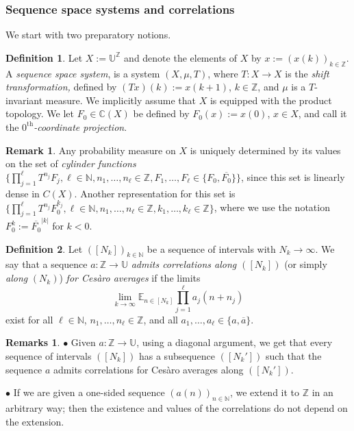 \documentclass[11pt]{amsart}
\theoremstyle{definition}
\newtheorem{definition}{Definition}[section]
\newtheorem*{remark}{Remark}
\newtheorem*{remarks}{Remarks}
\newcommand{\C}{{\mathbb C}}
\newcommand{\E}{{\mathbb E}}
\newcommand{\N}{{\mathbb N}}
\newcommand{\Z}{{\mathbb Z}}
\newcommand{\U}{{\mathbb U}}
\begin{document}
\subsubsection{Sequence space systems and correlations}
We start with two preparatory notions.
\begin{definition}\label{D:sequencespace}
Let  $X:=\U^\Z$ and denote  the elements of $X$ by $x:=(x(k))_{k\in\Z}$.
	A {\em sequence space system}, is a system $(X,\mu,T)$, where  $T\colon X\to X$  is the {\em shift transformation,}    defined by $(Tx)(k):=x(k+1)$, $k\in \Z$, and $\mu$ is a $T$-invariant measure. We implicitly assume that $X$ is equipped with the product topology.
	We let $F_0\in \C(X)$  be defined by $F_0(x):=x(0)$, $x \in X$, and call it the {\em $0^{\text{th}}$-coordinate projection}.
\end{definition}
\begin{remark} Any probability measure on $X$ is uniquely determined by its values on the set of {\em cylinder functions}
	$\{\prod_{j=1}^\ell T^{n_j} F_{j}, \ell\in\N, n_1,\ldots, n_\ell\in \Z,  F_1,\ldots, F_\ell \in\{F_0,\overline{F_0}\}\}$, since this set is
	linearly dense in $C(X)$. Another  representation for this set  is
	$\{\prod_{j=1}^\ell T^{n_j}F^{k_j}_0, \ell\in\N, n_1,\ldots, n_\ell\in \Z,  k_1,\ldots, k_\ell\in \Z\}$, where we use the notation $F_0^{k}:=\overline{F_0}^{|k|}$ for $k<0$.
\end{remark}


\begin{definition}
	Let   $ ([N_k])_{k\in\N}$ be a sequence of intervals with $N_k\to \infty$.
	We say that a sequence $a\colon \Z\to \U$
	{\em admits   correlations  along $ ([N_k])$} (or simply {\em along} $(N_k)$)  {\em for Ces\`aro averages}   if the   limits
	\begin{equation}\label{E:CorDef}
		\lim_{k\to\infty}\E_{n\in[N_k]} \prod_{j=1}^\ell a_j(n+n_j)
	\end{equation}
	exist for all $\ell \in \N$, $n_1,\ldots, n_\ell\in \Z$,  and all   $a_1,\ldots, a_\ell\in \{a,\overline{a}\}$.
\end{definition}
\begin{remarks}
	$\bullet$	 Given $a\colon \Z \to \U$,   using a diagonal argument, we get that every sequence of intervals $([N_k])$
	has a subsequence $([N_k'])$ such that the sequence  $a$  admits  correlations for Ces\`aro averages  along $([N_k'])$.
	
	$\bullet$
	If we are given a one-sided sequence $(a(n))_{n\in\N}$, we extend it to $\Z$ in an arbitrary way; then the existence and values of the correlations do not depend on the extension.
\end{remarks}
\end{document}
